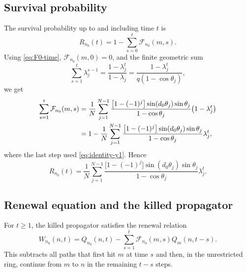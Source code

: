 \documentclass[11pt]{article}
\begin{document}
\subsection{Survival probability}

The survival probability up to and including time $t$ is
\begin{equation}
  R_{n_0}(t)=1-\sum_{s=0}^{t}\mathcal F_{n_0}(m,s).
\end{equation}
Using \eqref{eq:F0-time}, $\mathcal F_{n_0}(m,0)=0$, and the finite geometric sum
\begin{equation}
  \sum_{s=1}^{t}\lambda_j^{s-1}=\frac{1-\lambda_j^t}{1-\lambda_j}
  =\frac{1-\lambda_j^t}{q(1-\cos\theta_j)},
\end{equation}
we get
\begin{align}
  \sum_{s=1}^{t}\mathcal F_{n_0}(m,s)
  &=\frac1N\sum_{j=1}^{N-1}
  \frac{\bigl[1-(-1)^j\bigr]\sin(d_0\theta_j)\sin\theta_j}
  {1-\cos\theta_j}
  \bigl(1-\lambda_j^t\bigr)\notag\\
  &=1-\frac1N\sum_{j=1}^{N-1}
  \frac{\bigl[1-(-1)^j\bigr]\sin(d_0\theta_j)\sin\theta_j}
  {1-\cos\theta_j}\lambda_j^t,
\end{align}
where the last step used \eqref{eq:identity-y1}.  Hence
\begin{equation}
  \boxed{
  R_{n_0}(t)=\frac1N\sum_{j=1}^{N-1}
  \frac{\bigl[1-(-1)^j\bigr]\sin(d_0\theta_j)\sin\theta_j}
  {1-\cos\theta_j}\lambda_j^t.}
  \label{eq:survival}
\end{equation}

\subsection{Renewal equation and the killed propagator}

For $t\geq1$, the killed propagator satisfies the renewal relation
\begin{equation}
  W_{n_0}(n,t)=Q_{n_0}(n,t)
  -\sum_{s=1}^{t}\mathcal F_{n_0}(m,s)Q_m(n,t-s).
  \label{eq:renewal}
\end{equation}
This subtracts all paths that first hit $m$ at time $s$ and then, in the unrestricted ring,
continue from $m$ to $n$ in the remaining $t-s$ steps.
\end{document}
